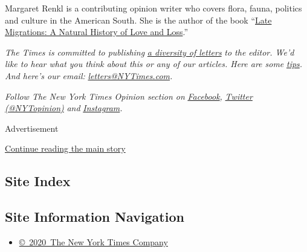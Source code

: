 Margaret Renkl is a contributing opinion writer who covers flora, fauna,
politics and culture in the American South. She is the author of the
book ``\href{https://milkweed.org/book/late-migrations}{Late Migrations:
A Natural History of Love and Loss}.''

\emph{The Times is committed to publishing}
\href{https://www.nytimes3xbfgragh.onion/2019/01/31/opinion/letters/letters-to-editor-new-york-times-women.html}{\emph{a
diversity of letters}} \emph{to the editor. We'd like to hear what you
think about this or any of our articles. Here are some}
\href{https://help.nytimes3xbfgragh.onion/hc/en-us/articles/115014925288-How-to-submit-a-letter-to-the-editor}{\emph{tips}}\emph{.
And here's our email:}
\href{mailto:letters@NYTimes.com}{\emph{letters@NYTimes.com}}\emph{.}

\emph{Follow The New York Times Opinion section on}
\href{https://www.facebookcorewwwi.onion/nytopinion}{\emph{Facebook}}\emph{,}
\href{http://twitter.com/NYTOpinion}{\emph{Twitter (@NYTopinion)}}
\emph{and}
\href{https://www.instagram.com/nytopinion/}{\emph{Instagram}}\emph{.}

Advertisement

\protect\hyperlink{after-bottom}{Continue reading the main story}

\hypertarget{site-index}{%
\subsection{Site Index}\label{site-index}}

\hypertarget{site-information-navigation}{%
\subsection{Site Information
Navigation}\label{site-information-navigation}}

\begin{itemize}
\tightlist
\item
  \href{https://help.nytimes3xbfgragh.onion/hc/en-us/articles/115014792127-Copyright-notice}{©~2020~The
  New York Times Company}
\end{itemize}

